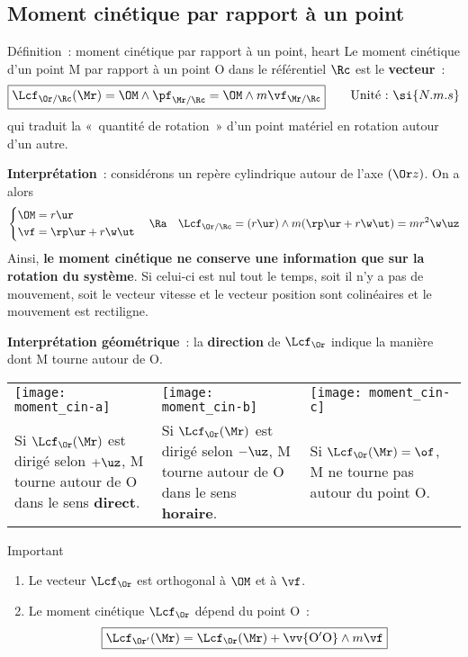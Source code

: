 \documentclass[../main/main.tex]{subfiles}
\begin{document}
\subsection{Moment cinétique par rapport à un point}
\begin{tdefi}{Définition~: moment cinétique par rapport à un point, heart}
    Le moment cinétique d'un point M par rapport à un point O dans le
    référentiel $\Rc$ est le \textbf{vecteur}~:
    \[
        \boxed{\Lcf_{\Or/\Rc}(\Mr) = \OM\wedge\pf_{\Mr/\Rc} = \OM\wedge
        m\vf_{\Mr/\Rc}}
        \qquad
        \text{Unité~:~}
        \si{N.m.s}
    \]
    qui traduit la «~quantité de rotation~» d'un point matériel en rotation
    autour d'un autre.
\end{tdefi}

\textbf{Interprétation}~: considérons un repère cylindrique autour de l'axe
$(\Or z)$. On a alors
\[
    \left\{
        \begin{aligned}
            \OM &= r\ur\\
            \vf &= \rp\ur + r\w\ut
        \end{aligned}
    \right.
    \quad\Ra\quad
    \Lcf_{\Or/\Rc} = (r\ur)\wedge m(\rp\ur+r\w\ut) = mr^2\w\uz
\]
Ainsi, \textbf{le moment cinétique ne conserve une information que sur la
rotation du système}. Si celui-ci est nul tout le temps, soit il n'y a pas de
mouvement, soit le vecteur vitesse et le vecteur position sont colinéaires et le
mouvement est rectiligne.

\textbf{Interprétation géométrique}~: la \textbf{direction} de $\Lcf_{\Or}$
indique la manière dont M tourne autour de O.
\begin{center}
    \begin{tabularx}{\linewidth}{YYY}
        \texttt{[image: moment\_cin-a]} &
        \texttt{[image: moment\_cin-b]} &
        \texttt{[image: moment\_cin-c]}
        \\
        Si $\Lcf_{\Or}(\Mr)$ est dirigé selon $+\uz$, M tourne autour de O dans
        le sens \textbf{direct}. &
        Si $\Lcf_{\Or}(\Mr)$ est dirigé selon $-\uz$, M tourne autour de O dans
        le sens \textbf{horaire}. &
        Si $\Lcf_{\Or}(\Mr) = \of$, M ne tourne pas autour du point O.
    \end{tabularx}
\end{center}

\begin{rimpo}{Important}
    \begin{enumerate}
        \item Le vecteur $\Lcf_{\Or}$ est orthogonal à $\OM$ et à $\vf$.
        \item Le moment cinétique $\Lcf_{\Or}$ dépend du point O~:
            \[
                \boxed{\Lcf_{\Or'}(\Mr) = \Lcf_{\Or}(\Mr) + \vv{\rm O'O}\wedge
                m\vf}
            \]
    \end{enumerate}
\end{rimpo}
\end{document}

